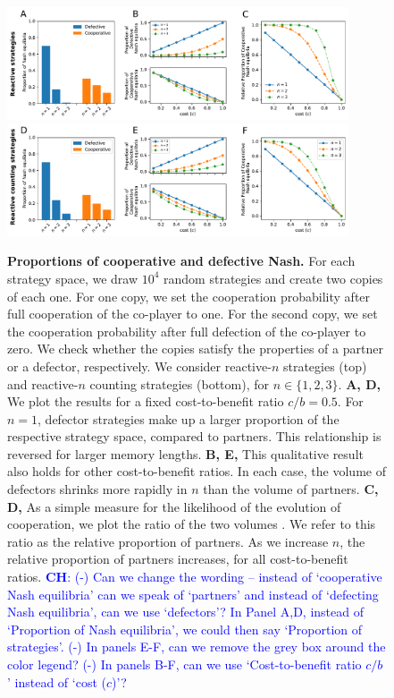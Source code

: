\documentclass[9pt,twoside,lineno]{pnas-new}
\newcommand{\christian}[1]{\textcolor{blue}{\textbf{CH}: #1}}
\theoremstyle{plainCl1}
\theoremstyle{plainCl2}
\begin{document}
\begin{figure}[tbph]
  \centering
  \includegraphics[width=0.9\textwidth]{../../figures/siFig1.pdf}
  \includegraphics[width=0.9\textwidth]{../../figures/siFig1Counting.pdf}
  \caption{
  \textbf{Proportions of cooperative and defective Nash.}
For each strategy space, we draw \(10^4\) random strategies and create two copies of each one. 
For one copy, we set the cooperation probability after full cooperation of the co-player to one. 
For the second copy, we set the cooperation probability after full defection of the co-player to zero. 
We check whether the copies satisfy the properties of a partner or a defector, respectively.  
We consider reactive-$n$ strategies (top) and reactive-$n$ counting strategies (bottom), for $n\!\in\!\{1,2,3\}$. 
\textbf{A, D,} We plot the results for a fixed cost-to-benefit ratio \(c/b \!=\!0.5\). 
For $n\!=\!1$, defector strategies make up a larger proportion of the respective strategy space, compared to partners. 
This relationship is reversed for larger memory lengths. 
\textbf{B, E,} This qualitative result also holds for other cost-to-benefit ratios. In each case, the volume of defectors shrinks more rapidly in $n$ than the volume of partners. 
\textbf{C, D,} As a simple measure for the likelihood of the evolution of cooperation, we plot the ratio of the two volumes \citep[see also Ref.][]{stewart:scientific:2016}.
We refer to this ratio as the relative proportion of partners. 
As we increase $n$, the relative proportion of partners increases, for all cost-to-benefit ratios. \newline
\christian{(-) Can we change the wording -- instead of `cooperative Nash equilibria' can we speak of `partners' and instead of `defecting Nash equilibria', can we use `defectors'? In Panel A,D, instead of `Proportion of Nash equilibria', we could then say `Proportion of strategies'. (-) In panels E-F, can we remove the grey box around the color legend? (-) In panels B-F, can we use `Cost-to-benefit ratio $c/b$' instead of `cost ($c$)'?}
}\label{fig:siFigDefectiveCooperativeNash}


\end{figure}
\end{document}
